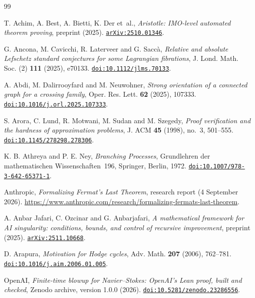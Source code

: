 \begin{thebibliography}{99}\raggedright

T. Achim, A. Best, A. Bietti, K. Der et~al.,
\emph{Aristotle: IMO-level automated theorem proving},
preprint (2025).
\href{https://arxiv.org/abs/2510.01346}{\nolinkurl{arXiv:2510.01346}}.

G. Ancona, M. Cavicchi, R. Laterveer and G. Sacc\`a,
\emph{Relative and absolute Lefschetz standard conjectures for some Lagrangian fibrations},
J. Lond. Math. Soc. (2) \textbf{111} (2025), e70133.
\href{https://doi.org/10.1112/jlms.70133}{\nolinkurl{doi:10.1112/jlms.70133}}.

A. Abdi, M. Dalirrooyfard and M. Neuwohner,
\emph{Strong orientation of a connected graph for a crossing family},
Oper. Res. Lett. \textbf{62} (2025), 107333.
\href{https://doi.org/10.1016/j.orl.2025.107333}{\nolinkurl{doi:10.1016/j.orl.2025.107333}}.

S. Arora, C. Lund, R. Motwani, M. Sudan and M. Szegedy,
\emph{Proof verification and the hardness of approximation problems},
J. ACM \textbf{45} (1998), no.~3, 501--555.
\href{https://doi.org/10.1145/278298.278306}{\nolinkurl{doi:10.1145/278298.278306}}.

K. B. Athreya and P. E. Ney,
\emph{Branching Processes},
Grundlehren der mathematischen Wissenschaften~196, Springer, Berlin, 1972.
\href{https://doi.org/10.1007/978-3-642-65371-1}{\nolinkurl{doi:10.1007/978-3-642-65371-1}}.

Anthropic,
\emph{Formalizing Fermat's Last Theorem},
research report (4 September 2026).
\url{https://www.anthropic.com/research/formalizing-fermats-last-theorem}.

A. Anbar Jafari, C. Ozcinar and G. Anbarjafari,
\emph{A mathematical framework for AI singularity: conditions, bounds, and control of recursive improvement},
preprint (2025).
\href{https://arxiv.org/abs/2511.10668}{\nolinkurl{arXiv:2511.10668}}.

D. Arapura,
\emph{Motivation for Hodge cycles},
Adv. Math. \textbf{207} (2006), 762--781.
\href{https://doi.org/10.1016/j.aim.2006.01.005}{\nolinkurl{doi:10.1016/j.aim.2006.01.005}}.

OpenAI,
\emph{Finite-time blowup for Navier--Stokes: OpenAI's Lean proof, built and checked},
Zenodo archive, version 1.0.0 (2026).
\href{https://doi.org/10.5281/zenodo.23286556}{\nolinkurl{doi:10.5281/zenodo.23286556}}.


\end{thebibliography}
